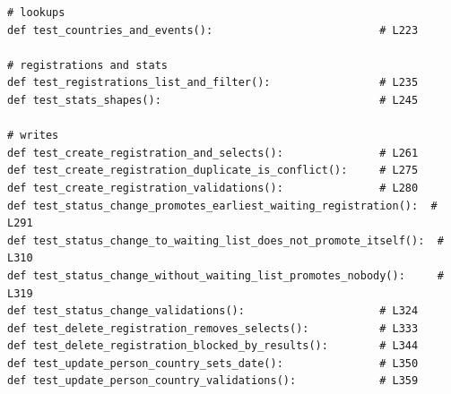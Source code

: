 \documentclass[11pt,a4paper]{article}
\begin{document}
\begin{lstlisting}
# lookups
def test_countries_and_events():                          # L223

# registrations and stats
def test_registrations_list_and_filter():                 # L235
def test_stats_shapes():                                  # L245

# writes
def test_create_registration_and_selects():               # L261
def test_create_registration_duplicate_is_conflict():     # L275
def test_create_registration_validations():               # L280
def test_status_change_promotes_earliest_waiting_registration():  # L291
def test_status_change_to_waiting_list_does_not_promote_itself():  # L310
def test_status_change_without_waiting_list_promotes_nobody():     # L319
def test_status_change_validations():                     # L324
def test_delete_registration_removes_selects():           # L333
def test_delete_registration_blocked_by_results():        # L344
def test_update_person_country_sets_date():               # L350
def test_update_person_country_validations():             # L359
\end{lstlisting}
\end{document}
